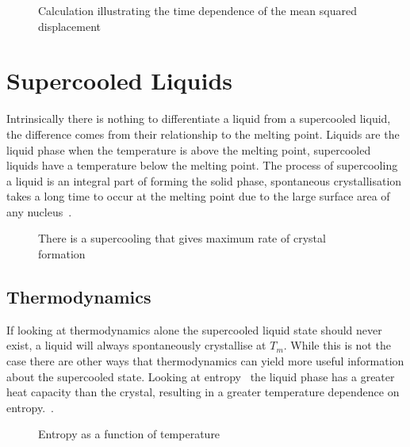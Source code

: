 \begin{figure}
    \label{fig:MSD}
    \caption{Calculation illustrating the time dependence of the mean squared displacement}
\end{figure}



\section{Supercooled Liquids}

Intrinsically there is nothing to differentiate a liquid from a supercooled liquid, the difference comes from their relationship to the melting point. Liquids are the liquid phase when the temperature is above the melting point, supercooled liquids have a temperature below the melting point. The process of supercooling a liquid is an integral part of forming the solid phase, spontaneous crystallisation takes a long time to occur at the melting point due to the large surface area of any nucleus~.

\begin{figure}
    \caption{There is a supercooling that gives maximum rate of crystal formation}
    \label{fig:supercool crys}
\end{figure}


\subsection{Thermodynamics}

If looking at thermodynamics alone the supercooled liquid state should never exist, a liquid will always spontaneously crystallise at $T_m$. While this is not the case there are other ways that thermodynamics can yield more useful information about the supercooled state. Looking at entropy~ the liquid phase has a greater heat capacity than the crystal, resulting in a greater temperature dependence on entropy.~\cite{debenedetti:01}.

\begin{figure}
    \caption{Entropy as a function of temperature}
    \label{fig:entropy}
\end{figure}

